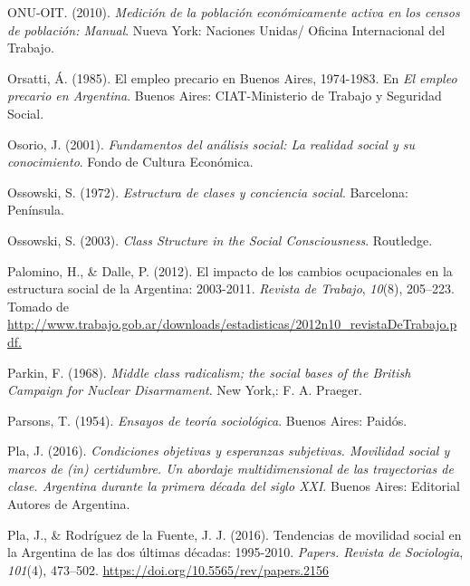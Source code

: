 \documentclass[
]{article}
\newlength{\cslhangindent}
\newlength{\cslentryspacingunit} %
\newenvironment{CSLReferences}[2] %
 {%
  \setlength{\parindent}{0pt}
  \ifodd #1
  \let\oldpar\par
  \def\par{\hangindent=\cslhangindent\oldpar}
  \fi
  \setlength{\parskip}{#2\cslentryspacingunit}
 }%
 {}
\begin{document}
\begin{CSLReferences}{1}{0}
\leavevmode{}%
ONU-OIT. (2010). \emph{Medición de la población económicamente activa en los censos de población: {Manual}}. Nueva York: Naciones Unidas/ Oficina Internacional del Trabajo.

\leavevmode{}%
Orsatti, Á. (1985). El empleo precario en {Buenos} {Aires}, 1974-1983. En \emph{El empleo precario en {Argentina}}. Buenos Aires: CIAT-Ministerio de Trabajo y Seguridad Social.

\leavevmode{}%
Osorio, J. (2001). \emph{Fundamentos del análisis social: La realidad social y su conocimiento}. Fondo de Cultura Económica.

\leavevmode{}%
Ossowski, S. (1972). \emph{Estructura de clases y conciencia social}. Barcelona: Península.

\leavevmode{}%
Ossowski, S. (2003). \emph{Class {Structure} in the {Social} {Consciousness}}. Routledge.

\leavevmode{}%
Palomino, H., \& Dalle, P. (2012). El impacto de los cambios ocupacionales en la estructura social de la {Argentina}: 2003-2011. \emph{Revista de Trabajo}, \emph{10}(8), 205--223. Tomado de \href{http://www.trabajo.gob.ar/downloads/estadisticas/2012n10_revistaDeTrabajo.pdf}{http://www.trabajo.gob.ar/downloads/estadisticas/2012n10\_revistaDeTrabajo.pdf.}

\leavevmode{}%
Parkin, F. (1968). \emph{Middle class radicalism; the social bases of the {British} {Campaign} for {Nuclear} {Disarmament}}. New York,: F. A. Praeger.

\leavevmode{}%
Parsons, T. (1954). \emph{Ensayos de teoría sociológica}. Buenos Aires: Paidós.

\leavevmode{}%
Pla, J. (2016). \emph{Condiciones objetivas y esperanzas subjetivas. {Movilidad} social y marcos de (in) certidumbre. {Un} abordaje multidimensional de las trayectorias de clase. {Argentina} durante la primera década del siglo {XXI}}. Buenos Aires: Editorial Autores de Argentina.

\leavevmode{}%
Pla, J., \& Rodríguez de la Fuente, J. J. (2016). Tendencias de movilidad social en la {Argentina} de las dos últimas décadas: 1995-2010. \emph{Papers. Revista de Sociologia}, \emph{101}(4), 473--502. \url{https://doi.org/10.5565/rev/papers.2156}


\end{CSLReferences}
\end{document}
